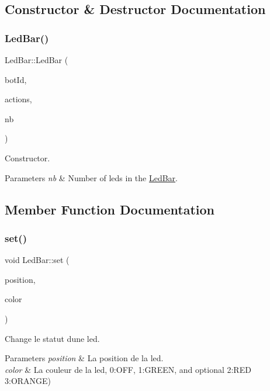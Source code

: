 \subsection{Constructor \& Destructor Documentation}
\mbox{\label{classLedBar_a4f2e86893b6d174c1dd11a46c3dcf480}} 
\subsubsection{\texorpdfstring{Led\+Bar()}{LedBar()}}
{\footnotesize\ttfamily Led\+Bar\+::\+Led\+Bar (\begin{DoxyParamCaption}\item[{std\+::string}]{bot\+Id,  }\item[{\hyperlink{classActions}{Actions} \&}]{actions,  }\item[{int}]{nb }\end{DoxyParamCaption})}



Constructor. 


\begin{DoxyParams}{Parameters}
{\em nb} & Number of leds in the \hyperlink{classLedBar}{Led\+Bar}. \\
\hline
\end{DoxyParams}


\subsection{Member Function Documentation}
\mbox{\label{classLedBar_a4f6f26d47d0ea82380cebb8c2b9ea7c3}} 
\subsubsection{\texorpdfstring{set()}{set()}}
{\footnotesize\ttfamily void Led\+Bar\+::set (\begin{DoxyParamCaption}\item[{int}]{position,  }\item[{Led\+Color}]{color }\end{DoxyParamCaption})}



Change le statut d\textquotesingle{}une led. 


\begin{DoxyParams}{Parameters}
{\em position} & La position de la led. \\
\hline
{\em color} & La couleur de la led, 0\+:O\+FF, 1\+:G\+R\+E\+EN, and optional 2\+:R\+ED 3\+:O\+R\+A\+N\+GE) \\
\hline
\end{DoxyParams}
\mbox{\label{classLedBar_a3069414fedb0a97740ffd3ff819d63f1}} 
